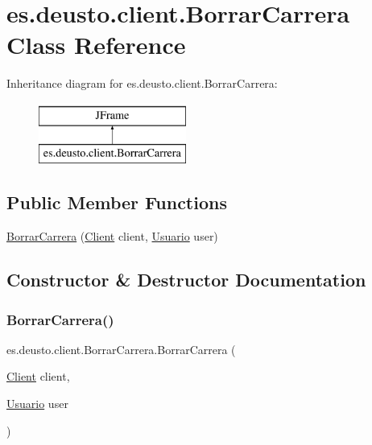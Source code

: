 \hypertarget{classes_1_1deusto_1_1client_1_1_borrar_carrera}{}\section{es.\+deusto.\+client.\+Borrar\+Carrera Class Reference}
\label{classes_1_1deusto_1_1client_1_1_borrar_carrera}
Inheritance diagram for es.\+deusto.\+client.\+Borrar\+Carrera\+:\begin{figure}[H]
\begin{center}
\leavevmode
\includegraphics[height=2.000000cm]{classes_1_1deusto_1_1client_1_1_borrar_carrera}
\end{center}
\end{figure}
\subsection*{Public Member Functions}
\begin{DoxyCompactItemize}
\item 
\mbox{\hyperlink{classes_1_1deusto_1_1client_1_1_borrar_carrera_a9fecff6662045446f0475bc998ba19b5}{Borrar\+Carrera}} (\mbox{\hyperlink{classes_1_1deusto_1_1client_1_1_client}{Client}} client, \mbox{\hyperlink{classes_1_1deusto_1_1server_1_1jdo_1_1_usuario}{Usuario}} user)
\end{DoxyCompactItemize}


\subsection{Constructor \& Destructor Documentation}
\mbox{\label{classes_1_1deusto_1_1client_1_1_borrar_carrera_a9fecff6662045446f0475bc998ba19b5}} 
\subsubsection{\texorpdfstring{BorrarCarrera()}{BorrarCarrera()}}
{\footnotesize\ttfamily es.\+deusto.\+client.\+Borrar\+Carrera.\+Borrar\+Carrera (\begin{DoxyParamCaption}\item[{\mbox{\hyperlink{classes_1_1deusto_1_1client_1_1_client}{Client}}}]{client,  }\item[{\mbox{\hyperlink{classes_1_1deusto_1_1server_1_1jdo_1_1_usuario}{Usuario}}}]{user }\end{DoxyParamCaption})}



